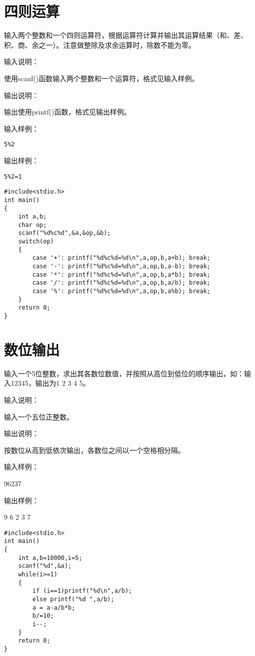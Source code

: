 \section{四则运算}
输入两个整数和一个四则运算符，根据运算符计算并输出其运算结果（和、差、积、商、余之一）。注意做整除及求余运算时，除数不能为零。

输入说明：

使用scanf()函数输入两个整数和一个运算符，格式见输入样例。

输出说明：

输出使用printf()函数，格式见输出样例。

输入样例：

\lstinline|5%2|

输出样例：

\lstinline|5%2=1|

\begin{lstlisting}
#include<stdio.h>    
int main()                   
{  
	int a,b;
	char op;
	scanf("%d%c%d",&a,&op,&b);
	switch(op)
	{
		case '+': printf("%d%c%d=%d\n",a,op,b,a+b); break;
		case '-': printf("%d%c%d=%d\n",a,op,b,a-b); break;
		case '*': printf("%d%c%d=%d\n",a,op,b,a*b); break;
		case '/': printf("%d%c%d=%d\n",a,op,b,a/b); break;
		case '%': printf("%d%c%d=%d\n",a,op,b,a%b); break;
	}
	return 0;           
}                 
\end{lstlisting}

\section{数位输出}
输入一个5位整数，求出其各数位数值，并按照从高位到低位的顺序输出，如：输入12345，输出为1 2 3 4 5。

输入说明：

输入一个五位正整数。

输出说明：

按数位从高到低依次输出，各数位之间以一个空格相分隔。

输入样例：

96237

输出样例：

9 6 2 3 7

\begin{lstlisting}
#include<stdio.h>      
int main()                   
{  
	int a,b=10000,i=5;
	scanf("%d",&a);
	while(i>=1)
	{
		if (i==1)printf("%d\n",a/b);
		else printf("%d ",a/b);
		a = a-a/b*b;
		b/=10;
		i--;
	} 
	return 0;           
}               
\end{lstlisting}


